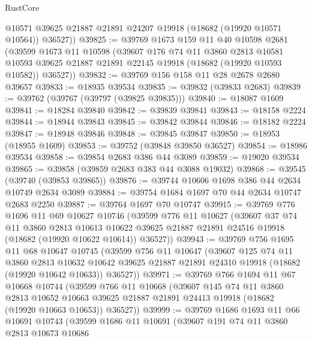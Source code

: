 \begin{lexlean}{RustCore}
\begin{coremodule}
        @10571
        @39625
        @21887
        @21891
        @24207
        @19918
        (@18682 (@19920 @10571 @10564))
        @36527))
@39825 := @39769
    @1673
    @159
    @11
    @40
    @10598
    @2681
    (@39599
      @1673
      @11
      @10598
      (@39607
        @176
        @74
        @11
        @3860
        @2813
        @10581
        @10593
        @39625
        @21887
        @21891
        @22145
        @19918
        (@18682 (@19920 @10593 @10582))
        @36527))
@39832 := @39769 @156 @158 @11 @28 @2678 @2680 @39657
@39833 := @18935 @39534
@39835 := @39832 (@39833 @2683)
@39839 := @39762 (@39767 (@39797 (@39825 @39835)))
@39840 := @18087 @1609
@39841 := @18284 @39840
@39842 := @39839 @39841
@39843 := @18158 @2224
@39844 := @18944 @39843
@39845 := @39842 @39844
@39846 := @18182 @2224
@39847 := @18948 @39846
@39848 := @39845 @39847
@39850 := @18953 (@18955 @1609)
@39853 := @39752 (@39848 @39850 @36527)
@39854 := @18986 @39534
@39858 := @39854 @2683 @386 @44 @3089
@39859 := @19020 @39534
@39865 := @39858 (@39859 @2683 @383 @44 @3088 @19032)
@39868 := @39545 (@39740 (@39853 @39865))
@39876 := @39744 @10606 @1698 @386 @44 @2634 @10749 @2634 @3089
@39884 := @39754 @1684 @1697 @70 @44 @2634 @10747 @2683 @2250
@39887 := @39764 @1697 @70 @10747
@39915 := @39769
    @776
    @1696
    @11
    @69
    @10627
    @10746
    (@39599
      @776
      @11
      @10627
      (@39607
        @37
        @74
        @11
        @3860
        @2813
        @10613
        @10622
        @39625
        @21887
        @21891
        @24516
        @19918
        (@18682 (@19920 @10622 @10614))
        @36527))
@39943 := @39769
    @756
    @1695
    @11
    @68
    @10647
    @10745
    (@39599
      @756
      @11
      @10647
      (@39607
        @125
        @74
        @11
        @3860
        @2813
        @10632
        @10642
        @39625
        @21887
        @21891
        @24310
        @19918
        (@18682 (@19920 @10642 @10633))
        @36527))
@39971 := @39769
    @766
    @1694
    @11
    @67
    @10668
    @10744
    (@39599
      @766
      @11
      @10668
      (@39607
        @145
        @74
        @11
        @3860
        @2813
        @10652
        @10663
        @39625
        @21887
        @21891
        @24413
        @19918
        (@18682 (@19920 @10663 @10653))
        @36527))
@39999 := @39769
    @1686
    @1693
    @11
    @66
    @10691
    @10743
    (@39599
      @1686
      @11
      @10691
      (@39607
        @191
        @74
        @11
        @3860
        @2813
        @10673
        @10686

\end{coremodule}
\end{lexlean}
